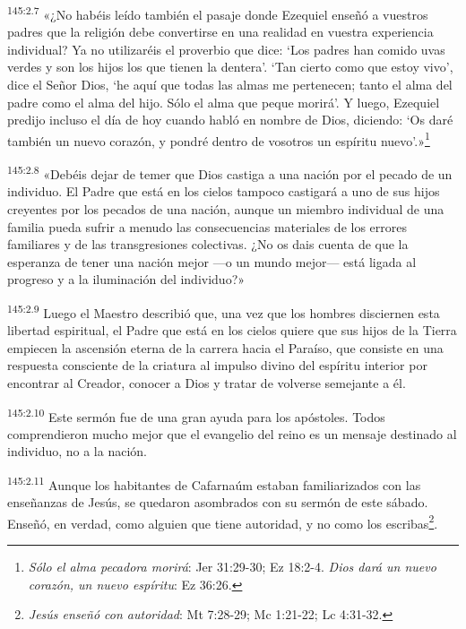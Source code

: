 \par
\textsuperscript{145:2.7} «¿No habéis leído también el pasaje donde Ezequiel enseñó a vuestros padres que la religión debe convertirse en una realidad en vuestra experiencia individual? Ya no utilizaréis el proverbio que dice: `Los padres han comido uvas verdes y son los hijos los que tienen la dentera'. `Tan cierto como que estoy vivo', dice el Señor Dios, `he aquí que todas las almas me pertenecen; tanto el alma del padre como el alma del hijo. Sólo el alma que peque morirá'. Y luego, Ezequiel predijo incluso el día de hoy cuando habló en nombre de Dios, diciendo: `Os daré también un nuevo corazón, y pondré dentro de vosotros un espíritu nuevo'.»\footnote{\textit{Sólo el alma pecadora morirá}: Jer 31:29-30; Ez 18:2-4. \textit{Dios dará un nuevo corazón, un nuevo espíritu}: Ez 36:26.}

\par
\textsuperscript{145:2.8} «Debéis dejar de temer que Dios castiga a una nación por el pecado de un individuo. El Padre que está en los cielos tampoco castigará a uno de sus hijos creyentes por los pecados de una nación, aunque un miembro individual de una familia pueda sufrir a menudo las consecuencias materiales de los errores familiares y de las transgresiones colectivas. ¿No os dais cuenta de que la esperanza de tener una nación mejor ---o un mundo mejor--- está ligada al progreso y a la iluminación del individuo?»

\par
\textsuperscript{145:2.9} Luego el Maestro describió que, una vez que los hombres disciernen esta libertad espiritual, el Padre que está en los cielos quiere que sus hijos de la Tierra empiecen la ascensión eterna de la carrera hacia el Paraíso, que consiste en una respuesta consciente de la criatura al impulso divino del espíritu interior por encontrar al Creador, conocer a Dios y tratar de volverse semejante a él.

\par
\textsuperscript{145:2.10} Este sermón fue de una gran ayuda para los apóstoles. Todos comprendieron mucho mejor que el evangelio del reino es un mensaje destinado al individuo, no a la nación.

\par
\textsuperscript{145:2.11} Aunque los habitantes de Cafarnaúm estaban familiarizados con las enseñanzas de Jesús, se quedaron asombrados con su sermón de este sábado. Enseñó, en verdad, como alguien que tiene autoridad, y no como los escribas\footnote{\textit{Jesús enseñó con autoridad}: Mt 7:28-29; Mc 1:21-22; Lc 4:31-32.}.

